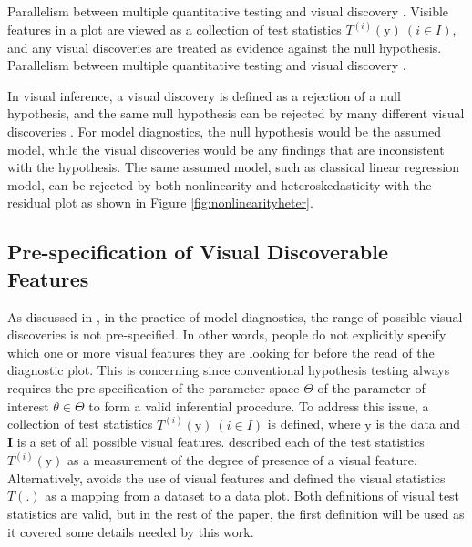 \documentclass{monashthesis}
\begin{document}
Parallelism between multiple quantitative testing and visual discovery \autocite{buja_statistical_2009}. Visible features in a plot are viewed as a collection of test statistics \(T^{(i)}(\boldsymbol{\mathrm{y}})~(i \in I)\), and any visual discoveries are treated as evidence against the null hypothesis. Parallelism between multiple quantitative testing and visual discovery \autocite{buja_statistical_2009}.

In visual inference, a visual discovery is defined as a rejection of a null hypothesis, and the same null hypothesis can be rejected by many different visual discoveries \autocite{buja_statistical_2009}. For model diagnostics, the null hypothesis would be the assumed model, while the visual discoveries would be any findings that are inconsistent with the hypothesis. The same assumed model, such as classical linear regression model, can be rejected by both nonlinearity and heteroskedasticity with the residual plot as shown in Figure \ref{fig:nonlinearityheter}.

\hypertarget{pre-specification-of-visual-discoverable-features-1}{%
\subsection{Pre-specification of Visual Discoverable Features}\label{pre-specification-of-visual-discoverable-features-1}}

As discussed in \textcite{buja_statistical_2009}, in the practice of model diagnostics, the range of possible visual discoveries is not pre-specified. In other words, people do not explicitly specify which one or more visual features they are looking for before the read of the diagnostic plot. This is concerning since conventional hypothesis testing always requires the pre-specification of the parameter space \(\Theta\) of the parameter of interest \(\theta \in \Theta\) to form a valid inferential procedure. To address this issue, a collection of test statistics \(T^{(i)}(\boldsymbol{\mathrm{y}})~(i \in I)\) is defined, where \(\boldsymbol{\mathrm{y}}\) is the data and \(\boldsymbol{I}\) is a set of all possible visual features. \textcite{buja_statistical_2009} described each of the test statistics \(T^{(i)}(\boldsymbol{\mathrm{y}})\) as a measurement of the degree of presence of a visual feature. Alternatively, \textcite{majumder_validation_2013} avoids the use of visual features and defined the visual statistics \(T(.)\) as a mapping from a dataset to a data plot. Both definitions of visual test statistics are valid, but in the rest of the paper, the first definition will be used as it covered some details needed by this work.
\end{document}
